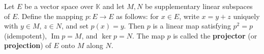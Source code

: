Let $E$ be a vector space over $\mathbb{K}$ and let $M, N$ be supplementary linear subspaces of $E$. Define the mapping $p \colon E \to E$ as follows: for $x \in E$, write $x = y + z$ uniquely with $y \in M$, $z \in N$, and set $p(x) = y$. Then $p$ is a linear map satisfying $p^2 = p$ (idempotent), $\operatorname{Im} p = M$, and $\ker p = N$. The map $p$ is called the \textbf{projector} (or \textbf{projection}) of $E$ onto $M$ along $N$.
